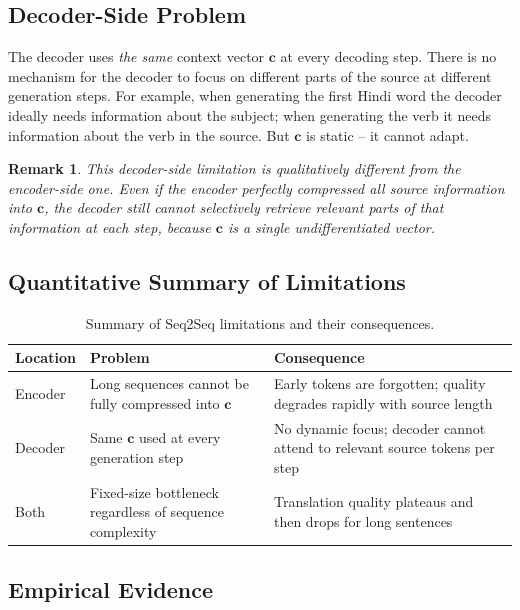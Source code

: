 \documentclass[12pt,a4paper]{article}
\newtheorem{remark}{Remark}[section]
\begin{document}
\subsection{Decoder-Side Problem}

The decoder uses \emph{the same} context vector $\mathbf{c}$ at every decoding step. There is
no mechanism for the decoder to focus on different parts of the source at different generation
steps. For example, when generating the first Hindi word the decoder ideally needs information
about the subject; when generating the verb it needs information about the verb in the source.
But $\mathbf{c}$ is static -- it cannot adapt.

\begin{remark}
  This decoder-side limitation is qualitatively different from the encoder-side one. Even if the
  encoder perfectly compressed all source information into $\mathbf{c}$, the decoder still cannot
  selectively retrieve \emph{relevant} parts of that information at each step, because
  $\mathbf{c}$ is a single undifferentiated vector.
\end{remark}

\subsection{Quantitative Summary of Limitations}

\begin{table}[htbp]
  \centering
  \caption{Summary of Seq2Seq limitations and their consequences.}
  \label{tab:limitations}
  \begin{tabular}{@{}p{3cm}p{5.5cm}p{5cm}@{}}
    \toprule
    \textbf{Location} & \textbf{Problem} & \textbf{Consequence} \\
    \midrule
    Encoder & Long sequences cannot be fully compressed into $\mathbf{c}$ & Early tokens are forgotten; quality degrades rapidly with source length \\
    \midrule
    Decoder & Same $\mathbf{c}$ used at every generation step & No dynamic focus; decoder cannot attend to relevant source tokens per step \\
    \midrule
    Both & Fixed-size bottleneck regardless of sequence complexity & Translation quality plateaus and then drops for long sentences \\
    \bottomrule
  \end{tabular}
\end{table}

\subsection{Empirical Evidence}
\end{document}
